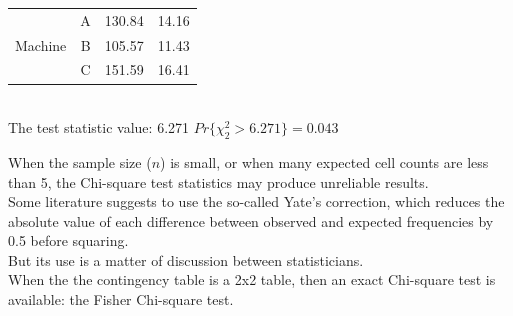 \begin{frame}
\begin{footnotesize}
\begin{tabular}{|c|c|r|r|}
      & \multicolumn{1}{|c|}{\hspace*{.5cm}A\hspace*{.5cm}} & \multicolumn{1}{|r|}{130.84} & \multicolumn{1}{|r|}{14.16}\\ \cline{2-4}
      \multicolumn{1}{|c|}{Machine} & \multicolumn{1}{|c|}{B} & \multicolumn{1}{|r|}{105.57} & \multicolumn{1}{|r|}{11.43}\\ \cline{2-4}
      & \multicolumn{1}{|c|}{C} & \multicolumn{1}{|r|}{151.59} & \multicolumn{1}{|r|}{16.41}\\ \hline
    \end{tabular}\\
    \vspace*{.5cm}
    The test statistic value: 6.271 \hspace*{1cm} $Pr\{\chi_2^2>6.271\}=0.043$
  \end{footnotesize}
\end{frame}


\begin{frame}
  \vspace*{.25cm}
  When the sample size ($n$) is small, or when many expected cell counts are less than 5, the Chi-square test statistics may produce unreliable results.\\
  \vspace*{.75cm}
  Some literature suggests to use the so-called Yate's correction, which reduces the absolute value of each difference between observed and expected frequencies by 0.5 before squaring.\\
  \vspace*{.75cm}
  But its use is a matter of discussion between statisticians.\\
  \vspace*{.75cm}
  When the the contingency table is a 2x2 table, then an exact Chi-square test is available: the Fisher Chi-square test.
\end{frame}


